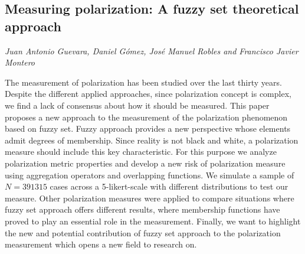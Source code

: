 \documentclass[../booklet.tex]{subfiles}
\begin{document}
\subsection[Measuring polarization: A fuzzy set theoretical approach. {\it Juan Antonio Guevara, Daniel Gómez, José Manuel Robles and Francisco Javier Montero}]{Measuring polarization: A fuzzy set theoretical approach}
   

\begin{center}
  {\it Juan Antonio Guevara, Daniel Gómez, José Manuel Robles and Francisco Javier Montero}
\end{center}



The measurement of polarization has been studied over the last thirty years. Despite the different applied approaches, since polarization concept is complex, we find a lack of consensus about how it should be measured. This paper proposes a new approach to the measurement of the polarization phenomenon based on fuzzy set. Fuzzy approach provides a new perspective whose elements admit degrees of membership. Since reality is not black and white, a polarization measure should include this key characteristic. For this purpose we analyze polarization metric properties and develop a new risk of polarization measure using aggregation operators and overlapping functions. We simulate a sample of $N = 391315$ cases across a 5-likert-scale with different distributions to test our measure. Other polarization measures were applied to compare situations where fuzzy set approach offers different results, where membership functions have proved to play an essential role in the measurement. Finally, we want to highlight the new and potential contribution of fuzzy set approach to the polarization measurement which opens a new field to research on.
\end{document}
